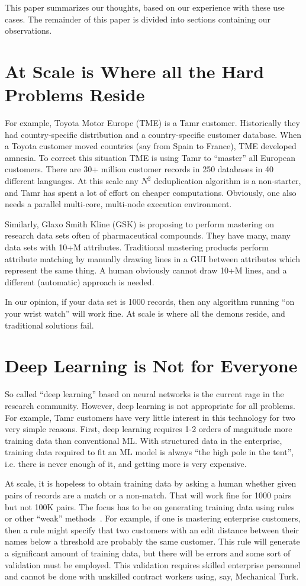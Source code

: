 \documentclass[11pt]{article}
\begin{document}
This paper summarizes our thoughts, based on our experience with these use cases. The remainder of this paper is divided into sections containing our observations.


\section{At Scale is Where all the Hard Problems Reside}
For example, Toyota Motor Europe (TME) is a Tamr customer.  Historically they had country-specific distribution and a country-specific customer database.  When a Toyota customer moved countries (say from Spain to France), TME developed amnesia.  To correct this situation TME is using Tamr to “master” all European customers.  There are 30+ million customer records in 250 databases in 40 different languages.    At this scale any $N^2$ deduplication algorithm is a non-starter, and Tamr has spent a lot of effort on cheaper computations.  Obviously, one also needs a parallel multi-core, multi-node execution environment. 

Similarly, Glaxo Smith Kline (GSK) is proposing to perform mastering on research data sets often of pharmaceutical compounds.  They have  many, many data sets with 10+M attributes.  Traditional mastering products perform attribute matching by manually drawing lines in a GUI between attributes which represent the same thing.  A human obviously cannot draw 10+M lines, and a different (automatic) approach is needed.  

In our opinion, if your data set is 1000 records, then any algorithm running “on your wrist watch” will work fine.  At scale is where all the demons reside, and traditional solutions fail.

\section{Deep Learning is Not for Everyone}
So called “deep learning” based on neural networks is the current rage in the research community.  However, deep learning is not appropriate for all problems.  For example, Tamr customers have very little interest in this technology for two very simple reasons.  First, deep learning requires 1-2 orders of magnitude more training data than conventional ML.  With structured data in the enterprise, training data required to fit an ML model is always “the high pole in the tent”,  i.e. there is never enough of it, and getting more is very expensive.  

At scale, it is hopeless to obtain training data by asking a human whether given pairs of records are a match or a non-match.  That will work fine for 1000 pairs but not 100K pairs.   The focus has to be on generating training data using rules or other “weak” methods~\cite{8}.  For example, if one is mastering enterprise customers, then a rule might specify that two customers with an edit distance between their names below a threshold are probably the same customer.  This rule will generate a significant amount of training data, but there will be errors and some sort of validation must be employed.   This validation requires skilled enterprise personnel and cannot be done with unskilled contract workers using, say, Mechanical Turk.
\end{document}
